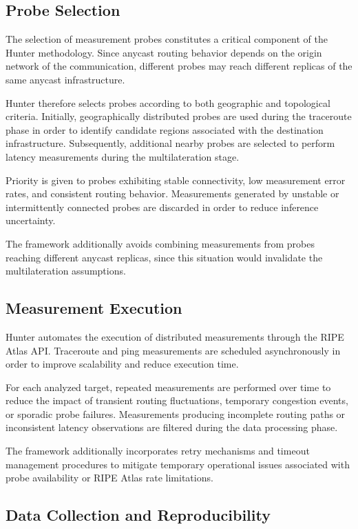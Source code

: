 \subsection{Probe Selection}

The selection of measurement probes constitutes a critical component of the Hunter methodology. Since anycast routing behavior depends on the origin network of the communication, different probes may reach different replicas of the same anycast infrastructure.

Hunter therefore selects probes according to both geographic and topological criteria. Initially, geographically distributed probes are used during the traceroute phase in order to identify candidate regions associated with the destination infrastructure. Subsequently, additional nearby probes are selected to perform latency measurements during the multilateration stage.

Priority is given to probes exhibiting stable connectivity, low measurement error rates, and consistent routing behavior. Measurements generated by unstable or intermittently connected probes are discarded in order to reduce inference uncertainty.

The framework additionally avoids combining measurements from probes reaching different anycast replicas, since this situation would invalidate the multilateration assumptions.

\subsection{Measurement Execution}

Hunter automates the execution of distributed measurements through the RIPE Atlas API. Traceroute and ping measurements are scheduled asynchronously in order to improve scalability and reduce execution time.

For each analyzed target, repeated measurements are performed over time to reduce the impact of transient routing fluctuations, temporary congestion events, or sporadic probe failures. Measurements producing incomplete routing paths or inconsistent latency observations are filtered during the data processing phase.

The framework additionally incorporates retry mechanisms and timeout management procedures to mitigate temporary operational issues associated with probe availability or RIPE Atlas rate limitations.

\subsection{Data Collection and Reproducibility}

